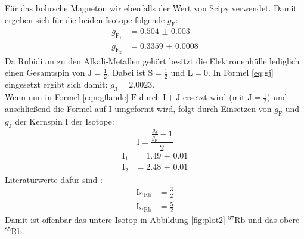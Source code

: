 \documentclass[
  bibliography=totoc,     %
  captions=tableheading,  %
  titlepage=firstiscover, %
]{scrartcl}
\begin{document}
\noindent
Für das bohrsche Magneton wir ebenfalls der Wert von Scipy \cite{scipyconst} verwendet.
Damit ergeben sich für die beiden Isotope folgende $g_\mathup{F}$:
\begin{align*}
  g_{\mathup{F}_1} &= \num{0.504(3)}\\
  g_{\mathup{F}_2} &= \num{0.3359(8)}
\end{align*}
\noindent
Da Rubidium zu den Alkali-Metallen gehört besitzt die Elektronenhülle lediglich
einen Gesamtspin von $\mathup{J} = \frac{1}{2}$. Dabei ist $\mathup{S} = \frac{1}{2}$
und $\mathup{L} = 0$. In Formel \eqref{eq:gj} eingesetzt ergibt sich damit:
$g_\mathup{J} = \num{2.0023}$.\\
Wenn nun in Formel \eqref{eqn:gflande} $\mathup{F}$ durch $\mathup{I}+\mathup{J}$
ersetzt wird (mit $\mathup{J} = \frac{1}{2}$) und anschließend die Formel auf $\mathup{I}$ umgeformt wird,
folgt durch Einsetzen von $g_\mathup{F}$ und $g_\mathup{J}$ der Kernspin $\mathup{I}$
der Isotope:
\begin{equation}
  \mathup{I} = \frac{\frac{g_\mathup{J}}{g_\mathup{F}}-1}{2}
\end{equation}
\begin{align*}
  \mathup{I}_1 &= \num{1.49(1)}\\
  \mathup{I}_2 &= \num{2.48(1)}
\end{align*}
Literaturwerte dafür sind \cite{rubwi}:
\begin{align*}
  \mathup{I}_{^{87}\mathup{Rb}} &= \frac{3}{2}\\
  \mathup{I}_{^{85}\mathup{Rb}} &= \frac{5}{2}
\end{align*}
Damit ist offenbar das untere Isotop in Abbildung \ref{fig:plot2} $^{87}\mathup{Rb}$
und das obere $^{85}\mathup{Rb}$.
\end{document}
